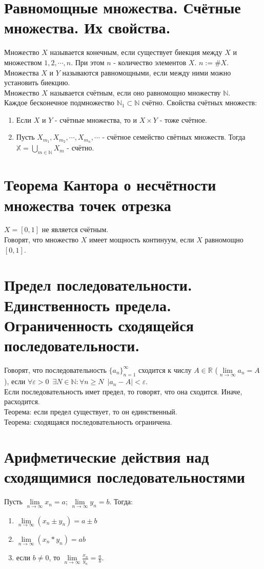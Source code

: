 \documentclass[11pt, a4paper]{article}
\def\X{\mathbb{X}}
\def\R{\mathbb{R}}
\def\N{\mathbb{N}}
\def\sp{\, \, \,}
\def\linf{\lim \limits_{n \to \infty}}
\begin{document}
    \section{Равномощные множества. Счётные множества. Их свойства.}
    Множество $X$ называется конечным, если существует биекция между $X$ и множеством $1, 2, \cdots , n$. При этом $n$ - количество элементов $X$. $n:= \# X$.\\
    Множества $X$ и $Y$ называются равномощными, если между ними можно установить биекцию.\\
    Множество $X$ называется счётным, если оно равномощно множеству $\N$.\\
    Каждое бесконечное подмножество $\N_1 \subset \N$ счётно.
    Свойства счётных множеств:
    \begin{enumerate}
        \item Если $X$ и $Y$ - счётные множества, то и $X \times Y$ - тоже счётное.
        \item Пусть $X_{m_1}, X_{m_2}, \cdots, X_{m_n}, \cdots$ - счётное семейство свётных множеств. Тогда $\X = \bigcup_{m \in \N} X_m$ - счётно.
    \end{enumerate}

    \section{Теорема Кантора о несчётности множества точек отрезка}
    $X=[0,1]$ не является счётным.\\
    Говорят, что множество $X$ имеет мощность континуум, если $X$ равномощно $[0,1]$.

    \section{Предел последовательности. Единственность предела. Ограниченность сходящейся последовательности.}
    Говорят, что последовательность $\{a_n\}_{n=1}^{\infty}$ сходится к числу $A \in \R$ ($\linf a_n = A$), если $\forall \varepsilon > 0 \sp \exists N \in \N: \forall n \geq N \sp |a_n - A| < \varepsilon$.\\
    Если последовательность имет предел, то говорят, что она сходится. Иначе, расходится.\\
    Теорема: если предел существует, то он единственный.\\
    Теорема: сходящаяся последовательность ограничена.\\

    \section{Арифметические действия над сходящимися последовательностями}
    Пусть $\linf x_n = a$; $\linf y_n = b$. Тогда:
    \begin{enumerate}
        \item $\linf (x_n \pm y_n) = a \pm b$
        \item $\linf (x_n * y_n) = ab$
        \item если $b \neq 0$, то $\linf \frac{x_n}{y_n} = \frac{a}{b}$.
    \end{enumerate}
\end{document}
